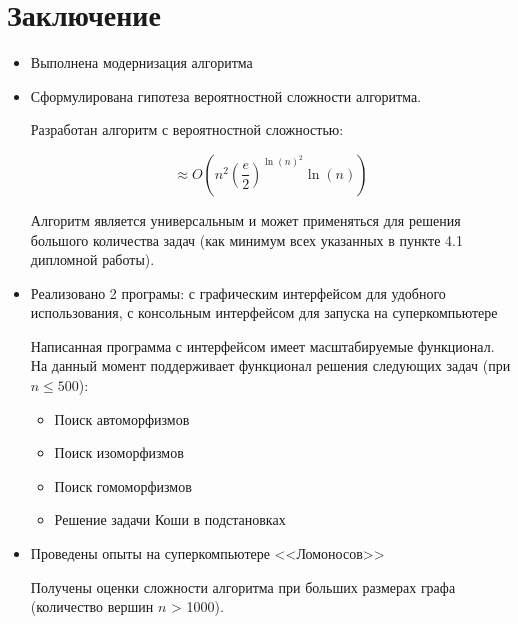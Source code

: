 \section*{Заключение}
\label{sec:Conclusion} 
\large

\begin{itemize}
\item Выполнена модернизация алгоритма
\item Сформулирована гипотеза вероятностной сложности алгоритма.

Разработан алгоритм с вероятностной сложностью:

$$\approx O(n^2(\frac{e}{2})^{\ln(n)^2} \ln(n))$$

Алгоритм является универсальным и может применяться для решения большого количества задач (как минимум всех указанных в пункте 4.1 дипломной работы).

\item Реализовано 2 програмы: с графическим интерфейсом для удобного использования, с консольным интерфейсом для запуска на суперкомпьютере

Написанная программа с интерфейсом имеет масштабируемые функционал. На данный момент поддерживает функционал решения следующих задач (при $n \leq  500$):

\begin{itemize}
\item Поиск автоморфизмов
\item Поиск изоморфизмов
\item Поиск гомоморфизмов
\item Решение задачи Коши в подстановках
\end{itemize}

\item Проведены опыты на суперкомпьютере <<Ломоносов>>

Получены оценки сложности алгоритма при больших размерах графа (количество вершин $n$ > 1000).

\end{itemize}
